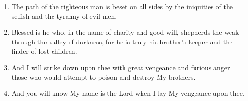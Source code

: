 \documentclass[a4paper, 11pt]{article}
\begin{document}
\begin{enumerate}
 \item The path of the righteous man is beset on all sides by the iniquities of the selfish and the tyranny of evil men. 
 \item Blessed is he who, in the name of charity and good will, shepherds the weak through the valley of darkness, for he is truly his brother's keeper and the finder of lost children. 
 \item And I will strike down upon thee with great vengeance and furious anger those who would attempt to poison and destroy My brothers. 
 \item And you will know My name is the Lord when I lay My vengeance upon thee.
\end{enumerate}
\end{document}
